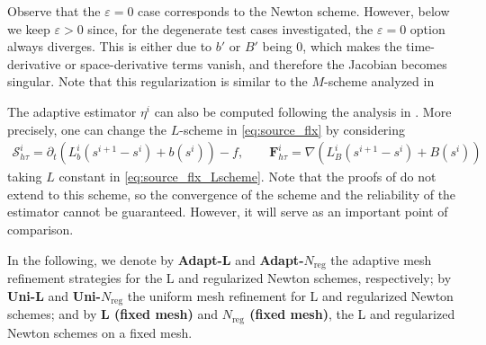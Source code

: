 \documentclass[review,11pt]{article}
\numberwithin{equation}{section}
\def \e  {\varepsilon}
\def \p  {\partial}
\def \htt {{h\tau}}
\def \calS {\mathcal{S}}
\def \Shti {\calS_\htt^i}
\def \Fhti {\bm{F}_\htt^i}
\begin{document}
Observe that the $\varepsilon=0$ case corresponds to the Newton scheme. However, below we keep $\e>0$ since, for the degenerate test cases investigated, the $\e=0$ option always diverges. This is either due to $b'$ or $B'$ being 0, which makes the time-derivative or space-derivative terms vanish, and therefore the Jacobian becomes singular.
Note that this regularization is similar to the $M$-scheme analyzed in \cite{mitra2019modified,javed2025robust}

The adaptive estimator $\eta^i$ can also be computed following the analysis in . More precisely, one can change the $L$-scheme in \eqref{eq:source_flx} by considering
\begin{align}\label{eq:ShFh_M}
\Shti=
\p_t(L^i_b(s^{i+1} - s^i) + b(s^i) )-f, \qquad
\Fhti=\nabla (L^i_B (s^{i+1} - s^i) + B(s^i))
\end{align}
taking $L$ constant in \eqref{eq:source_flx_Lscheme}. Note that the proofs of  do not extend to this scheme, so the convergence of the scheme and the reliability of the estimator cannot be guaranteed. However, it will serve as an important point of comparison.

In the following, we denote by \textbf{Adapt-L} and \textbf{Adapt-$N_{\mathrm{reg}}$} the adaptive mesh refinement strategies for the L and regularized Newton schemes, respectively; by \textbf{Uni-L} and \textbf{Uni-$N_{\mathrm{reg}}$} the uniform mesh refinement for L and regularized Newton schemes; and by \textbf{L (fixed mesh)} and \textbf{$N_{\mathrm{reg}}$ (fixed mesh)}, the L and regularized Newton schemes on a fixed mesh. 

\end{document}
